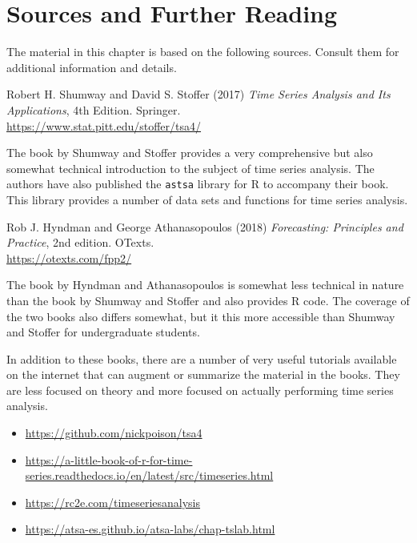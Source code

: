 %
%

\section*{Sources and Further Reading}

The material in this chapter is based on the following sources. Consult them for additional information and details.

\begin{tcolorbox}[colback=LavenderBlush2]
Robert H. Shumway and David S. Stoffer (2017) \emph{Time Series Analysis and Its Applications}, 4th Edition. Springer.\\

\vspace{.5\baselineskip}
\url{https://www.stat.pitt.edu/stoffer/tsa4/}
\end{tcolorbox}

The book by Shumway and Stoffer provides a very comprehensive but also somewhat technical introduction to the subject of time series analysis. The authors have also published the \texttt{astsa} library for R to accompany their book. This library provides a number of data sets and functions for time series analysis. 

\begin{tcolorbox}[colback=alert]
Rob J. Hyndman and George Athanasopoulos (2018) \emph{Forecasting: Principles and Practice}, 2nd edition. OTexts. \\

\vspace{.5\baselineskip}
\url{https://otexts.com/fpp2/} 
\end{tcolorbox}

The book by Hyndman and Athanasopoulos is somewhat less technical in nature than the book by Shumway and Stoffer and also provides R code. The coverage of the two books also differs somewhat, but it this more accessible than Shumway and Stoffer for undergraduate students.

In addition to these books, there are a number of very useful tutorials available on the internet that can augment or summarize the material in the books. They are less focused on theory and more focused on actually performing time series analysis.

\begin{tcolorbox}[colback=alert]
\begin{itemize}
\item \url{https://github.com/nickpoison/tsa4}
\item \url{https://a-little-book-of-r-for-time-series.readthedocs.io/en/latest/src/timeseries.html}
\item \url{https://rc2e.com/timeseriesanalysis}
\item \url{https://atsa-es.github.io/atsa-labs/chap-tslab.html}
\end{itemize}
\end{tcolorbox}

